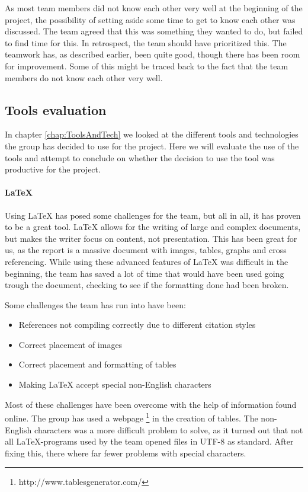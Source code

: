 \documentclass[11pt,a4paper,titlepage,oneside]{report}
\begin{document}
As most team members did not know each other very well at the beginning of the project, the possibility of setting aside some time to get to know each other was discussed. The team agreed that this was something they wanted to do, but failed to find time for this. In retrospect, the team should have prioritized this. The teamwork has, as described earlier, been quite good, though there has been room for improvement. Some of this might be traced back to the fact that the team members do not know each other very well.

\subsection{Tools evaluation}
\label{subsec:ToolsEvaluation}
In chapter \ref{chap:ToolsAndTech} we looked at the different tools and technologies the group has decided to use for the project. Here we will evaluate the use of the tools and attempt to conclude on whether the decision to use the tool was productive for the project.

\paragraph{\LaTeX}
Using \LaTeX{} has posed some challenges for the team, but all in all, it has proven to be a great tool. \LaTeX{} allows for the writing of large and complex documents, but makes the writer focus on content, not presentation. This has been great for us, as the report is a massive document with images, tables, graphs and cross referencing. While using these advanced features of \LaTeX{} was difficult in the beginning, the team has saved a lot of time that would have been used going trough the document, checking to see if the formatting done had been broken. 

Some challenges the team has run into have been:
\begin{itemize}
\item References not compiling correctly due to different citation styles
\item Correct placement of images
\item Correct placement and formatting of tables
\item Making LaTeX accept special non-English characters
\end{itemize}

Most of these challenges have been overcome with the help of information found online. The group has used a webpage \footnote{http://www.tablesgenerator.com/} in the creation of tables. The non-English characters was a more difficult problem to solve, as it turned out that not all \LaTeX-programs used by the team opened files in UTF-8 as standard. After fixing this, there where far fewer problems with special characters.
\end{document}
